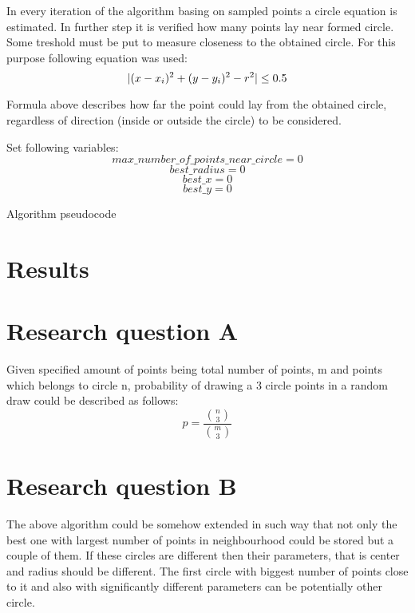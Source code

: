 \documentclass[notitlepage,english]{hgbreport}
\DeclarePairedDelimiter{\abs}{\lvert}{\rvert}
\begin{document}
In every iteration of the algorithm basing on sampled points a circle equation is estimated. In further step it is verified how many points lay near formed circle. Some treshold must be put to measure closeness to the obtained circle. For this purpose following equation was used:
\[\abs{(x-x_{i})^2+(y-y_{i})^2-r^2}\le0.5\]			

Formula above  describes how far the point could lay from the obtained circle, regardless of direction (inside or outside the circle) to be considered.

\begin{algorithm}[H]
\SetAlgoLined
{}
 Set following variables:
\[max\_number\_of\_points\_near\_circle=0\] 
 \[best\_radius=0\] 
 \[best\_x=0\] 
 \[best\_y=0\] 
 \caption{Algorithm pseudocode}
\end{algorithm}

\section {Results}

\section {Research question A}

Given specified amount of points being total number of points, m and points which belongs to circle n, probability of drawing a 3 circle points in a random draw could be described as follows:
\[p=\frac{\binom{n}{3}}{\binom{m}{3}}\]


\section {Research question B}

The above algorithm could be somehow extended in such way that not only the best one with largest number of points in neighbourhood could be stored but a couple of them. If these circles are different then their parameters, that is center and radius should be different. The first circle with biggest number of points close to it and also with significantly different parameters can be potentially other circle. 


\MakeBibliography[nosplit]
\end{document}
